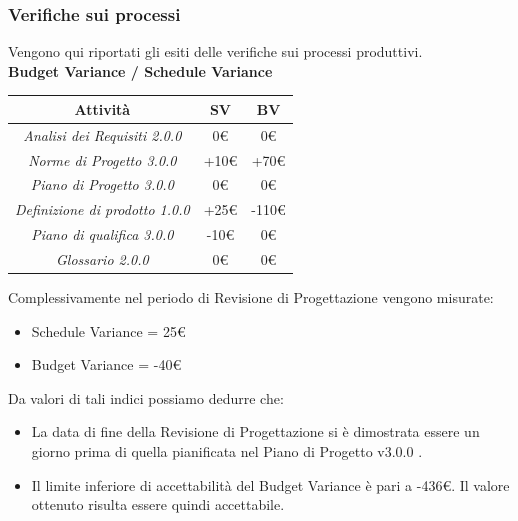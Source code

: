 {\begin{itemize}
  \end{itemize}
  \subsubsection{Verifiche sui processi}

  Vengono qui riportati gli esiti delle verifiche sui processi produttivi.\\


  \textbf{Budget Variance / Schedule Variance}

  \begin{center}
    \begin{tabular}{|c|c|c|}

      \hline
      \textbf{Attività} & \textbf{SV} & \textbf{BV} \\
      \hline
      \emph{Analisi dei Requisiti 2.0.0} & 0€ & 0€ \\
      \hline
      \emph{Norme di Progetto 3.0.0} & +10€ & +70€ \\
      \hline
      \emph{Piano di Progetto 3.0.0} & 0€ & 0€ \\
      \hline
      \emph{Definizione di prodotto 1.0.0} & +25€ & -110€ \\
      \hline
      \emph{Piano di qualifica 3.0.0} & -10€ & 0€ \\
      \hline
      \emph{Glossario 2.0.0} & 0€ & 0€ \\
      \hline
    \end{tabular}
  \end{center}

  Complessivamente nel periodo di Revisione di Progettazione vengono misurate:
  \begin{itemize}
  \item Schedule Variance = 25€
  \item Budget Variance = -40€
  \end{itemize}

  Da valori di tali indici possiamo dedurre che:
  \begin{itemize}
  \item La data di fine della Revisione di Progettazione si è dimostrata essere un
    giorno prima di quella pianificata nel Piano di Progetto v3.0.0 .
  \item  Il limite inferiore di accettabilità del Budget Variance è pari a -436€.
    Il valore ottenuto risulta essere quindi accettabile. 
  \end{itemize}


}
